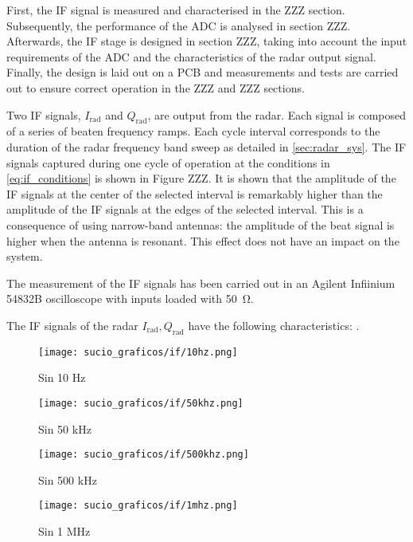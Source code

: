 
First, the IF signal is measured and characterised in the ZZZ section. Subsequently, the performance of the ADC is analysed in section ZZZ. Afterwards, the IF stage is designed in section ZZZ, taking into account the input requirements of the ADC and the characteristics of the radar output signal. Finally, the design is laid out on a PCB and measurements and tests are carried out to ensure correct operation in the ZZZ and ZZZ sections.

Two IF signals, $I_\mathrm{rad}$ and $Q_\mathrm{rad}$, are output from the radar. Each signal is composed of a series of beaten frequency ramps. Each cycle interval corresponds to the duration of the radar frequency band sweep as detailed in \cref{sec:radar_sys}. The IF signals captured during one cycle of operation at the conditions in \cref{eq:if_conditions} is shown in Figure ZZZ. It is shown that the amplitude of the IF signals at the center of the selected interval is remarkably higher than the amplitude of the IF signals at the edges of the selected interval. This is a consequence of using narrow-band antennas: the amplitude of the beat signal is higher when the antenna is resonant. This effect does not have an impact on the system.

The measurement of the IF signals has been carried out in an Agilent Infiinium 54832B oscilloscope with inputs loaded with \SI{50}{\ohm}.

The IF signals of the radar $I_\mathrm{rad},Q_\mathrm{rad}$ have the following characteristics:
.

\begin{figure}[ht]
	\centering
	\texttt{[image: sucio\_graficos/if/10hz.png]}
	\caption{Sin 10 Hz}
	\label{fig:moduloaprox50cmplancha}
\end{figure}
\begin{figure}[ht]
	\centering
	\texttt{[image: sucio\_graficos/if/50khz.png]}
	\caption{Sin 50 kHz}
	\label{fig:moduloaprox50cmplancha}
\end{figure}
\begin{figure}[ht]
	\centering
	\texttt{[image: sucio\_graficos/if/500khz.png]}
	\caption{Sin 500 kHz}
	\label{fig:moduloaprox50cmplancha}
\end{figure}
\begin{figure}[ht]
	\centering
	\texttt{[image: sucio\_graficos/if/1mhz.png]}
	\caption{Sin 1 MHz}
	\label{fig:moduloaprox50cmplancha}
\end{figure}

